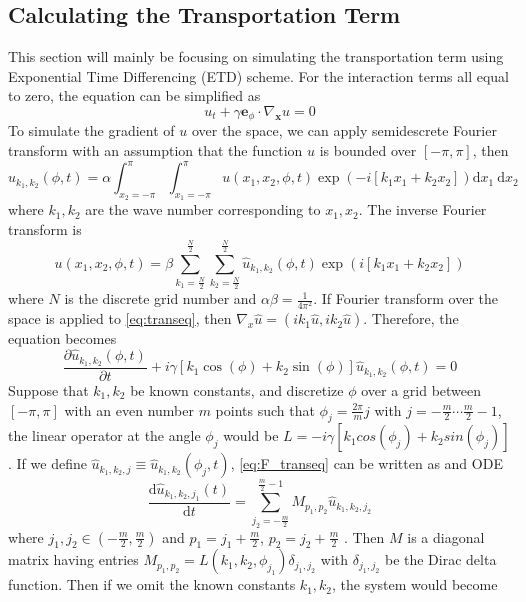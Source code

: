 \documentclass[12pt]{article}
\numberwithin{equation}{section}
\def\transeq{u_{t}+\gamma \mathbf{e}_{\phi} \cdot \nabla_{\boldsymbol{x}} u=0}
\def\fourieru{\hat{u}_{k_{1}, k_{2}}(\phi, t)=\alpha \int_{x_{2}=-\pi}^{\pi} \int_{x_{1}=-\pi}^{\pi}u\left(x_{1}, x_{2}, \phi, t\right) \exp \left(- i\left[k_{1} x_{1}+k_{2} x_{2}\right] \right) \mathrm{d} x_{1} \mathrm{~d} x_{2}}
\def\invfourieru{u\left(x_{1}, x_{2}, \phi, t\right)=\beta \sum_{k_{1}=\frac{N}{2}}^{\frac{N}{2}}\sum_{k_{2}=\frac{N}{2}}^{\frac{N}{2}} \hat{u}_{k_{1}, k_{2}}(\phi, t) \exp \left( i\left[k_{1} x_{1}+k_{2} x_{2}\right] \right)}
\def\F_transeq{\frac{\partial \hat{u}_{k_{1}, k_{2}}(\phi, t)}{\partial t}+ i \gamma\left[k_{1} \cos (\phi)+k_{2} \sin (\phi)\right] \hat{u}_{k_{1}, k_{2}}(\phi, t)=0}
\begin{document}
\subsection{Calculating the Transportation Term}
This section will mainly be focusing on simulating the transportation term using Exponential Time Differencing (ETD) scheme. For the interaction terms all equal to zero, the equation can be simplified as
\begin{equation}\label{eq:transeq}
\transeq
\end{equation}
To simulate the gradient of $u$ over the space, we can apply semidescrete Fourier transform with an assumption that the function $u$ is bounded over $[-\pi,\pi]$, then 
\begin{equation}\label{eq:semi_fourier}
\fourieru
\end{equation}
where $k_1, k_2$ are the wave number corresponding to $x_1,x_2$. The inverse Fourier transform is
\begin{equation}\label{eq:semi_invfourier}
\invfourieru
\end{equation}
where $N$ is the discrete grid number and $\alpha \beta = \frac{1}{4\pi^2}$. If Fourier transform over the space is applied to \eqref{eq:transeq}, then $\nabla_{x} \hat{u}=(ik_1\hat{u}, ik_2\hat{u})$. Therefore, the equation becomes
\begin{equation}\label{eq:F_transeq}
\F_transeq
\end{equation}
 Suppose that $k_1, k_2$ be known constants, and discretize $\phi$ over a grid between $[-\pi,\pi]$ with an even number $m$ points such that $\phi_j=\frac{2 \pi}{m}j$ with $j=-\frac{m}{2} \cdots \frac{m}{2}-1$, the linear operator at the angle $\phi_j$ would be $L=-i\gamma [k_1cos(\phi_j)+k_2sin(\phi_j)]$. If we define $\hat{u}_{k_{1}, k_{2}, j} \equiv \hat{u}_{k_{1}, k_{2}}\left(\phi_{j}, t\right)$, \eqref{eq:F_transeq} can be written as and ODE
 \begin{equation}\label{eq:M_transeq}
\frac{\mathrm{d} \hat{u}_{k_{1}, k_{2}, j_{1}}(t)}{\mathrm{d} t}=\sum_{j_{2}=-\frac{m}{2}}^{\frac{m}{2}-1} M_{p_{1}, p_{2}} \hat{u}_{k_{1}, k_{2}, j_{2}}
\end{equation}
where $j_1,j_2\in (-\frac{m}{2}, \frac{m}{2})$ and $p_1= j_1+\frac{m}{2}$, $p_2= j_2+\frac{m}{2}$ . Then $M$ is a diagonal matrix having entries $M_{p_1,p_2}=L(k_1,k_2,\phi_{j_1})\delta_{j_1,j_2}$  with $\delta_{j_1,j_2}$ be the Dirac delta function. Then if we omit the known constants $k_1, k_2$, the system would become
\end{document}
